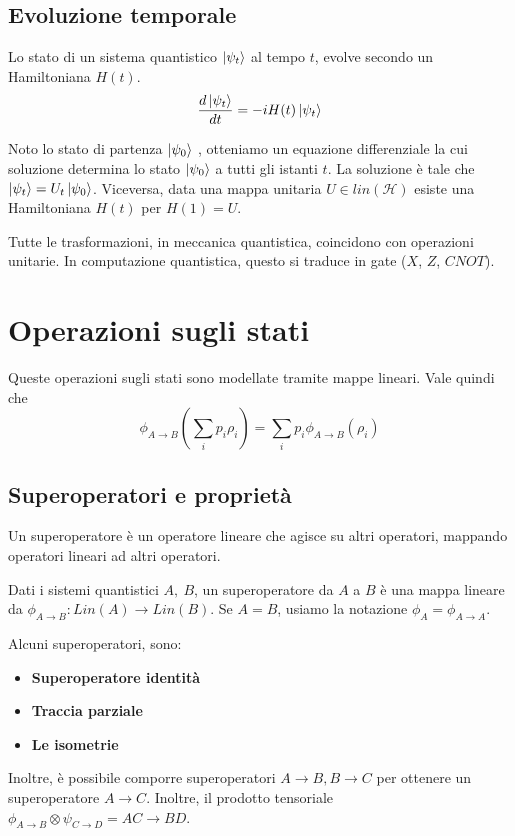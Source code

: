 \documentclass{report}
\begin{document}
\subsection{Evoluzione temporale}
Lo stato di un sistema quantistico $\ket{\psi_t}$ al tempo $t$, evolve secondo un Hamiltoniana $H(t)$.
\begin{equation}
\frac{d\ket{\psi_t}}{dt} = -i H(t)\ket{\psi_t}
\end{equation}

Noto lo stato di partenza $\ket{\psi_0}$ , otteniamo un equazione differenziale la cui soluzione determina lo stato $\ket{\psi_0}$ a tutti gli istanti $t$. La soluzione è tale che $\ket{\psi_t} = U_t\ket{\psi_0}$. Viceversa, data una mappa unitaria $U \in \textit{lin}(\mathcal H)$ esiste una Hamiltoniana $H(t)$ per $H(1) = U$.

Tutte le trasformazioni, in meccanica quantistica, coincidono con operazioni unitarie. In computazione quantistica, questo si traduce in gate ($X$, $Z$, $CNOT$).

\section{Operazioni sugli stati}
Queste operazioni sugli stati sono modellate tramite mappe lineari.
Vale quindi che
\begin{equation}
\phi_{A\to B}(\sum_i p_i\rho_i) = \sum_i p_i \phi_{A\to B}(\rho_i)
\end{equation}

\subsection{Superoperatori e proprietà}
Un superoperatore è un operatore lineare che agisce su altri operatori, mappando operatori lineari ad altri operatori.

Dati i sistemi quantistici $A, \ B$, un superoperatore da $A$ a $B$ è una mappa lineare da $\phi _{A \to B} : \textit{Lin}(A) \to \textit{Lin}(B)$. Se $A = B$, usiamo la notazione $\phi_A = \phi_{A\to A}$.

Alcuni superoperatori, sono:
\begin{itemize}
	\item \textbf{Superoperatore identità}
	\item \textbf{Traccia parziale}
	\item \textbf{Le isometrie}
\end{itemize}


Inoltre, è possibile comporre superoperatori $A \to B, B \to C$ per ottenere un superoperatore $A \to C$. 
Inoltre, il prodotto tensoriale $\phi_{A\to B} \otimes \psi_{C\to D} = AC \to BD$. 
\end{document}
